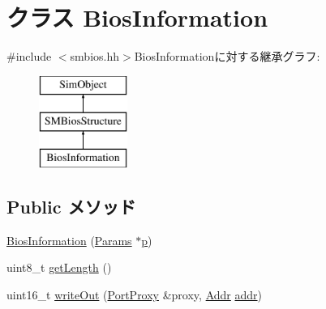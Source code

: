 \hypertarget{classX86ISA_1_1SMBios_1_1BiosInformation}{
\section{クラス BiosInformation}
\label{classX86ISA_1_1SMBios_1_1BiosInformation}
}


{\ttfamily \#include $<$smbios.hh$>$}BiosInformationに対する継承グラフ:\begin{figure}[H]
\begin{center}
\leavevmode
\includegraphics[height=3cm]{classX86ISA_1_1SMBios_1_1BiosInformation}
\end{center}
\end{figure}
\subsection*{Public メソッド}
\begin{DoxyCompactItemize}
\item 
\hyperlink{classX86ISA_1_1SMBios_1_1BiosInformation_aabfbb88f8bc8fdd4dbe37677c4049432}{BiosInformation} (\hyperlink{classX86ISA_1_1SMBios_1_1BiosInformation_a80894fc0e6b20b3b6808ca61edf19aa1}{Params} $\ast$\hyperlink{namespaceX86ISA_af675c1d542a25b96e11164b80809a856}{p})
\item 
uint8\_\-t \hyperlink{classX86ISA_1_1SMBios_1_1BiosInformation_a51bcc6f780d66596dbc3bedd845bc013}{getLength} ()
\item 
uint16\_\-t \hyperlink{classX86ISA_1_1SMBios_1_1BiosInformation_a2dbf6f51e91cb24abfc247d73c0b857d}{writeOut} (\hyperlink{classPortProxy}{PortProxy} \&proxy, \hyperlink{base_2types_8hh_af1bb03d6a4ee096394a6749f0a169232}{Addr} \hyperlink{namespaceX86ISA_ab705917f60c5566f9ce56a93f798b2e2}{addr})
\end{DoxyCompactItemize}
